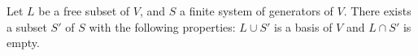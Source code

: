 Let $L$ be a free subset of $V$, and $S$ a finite system of generators of $V$. There exists a subset $S'$ of $S$ with the following properties: $L \cup S'$ is a basis of $V$ and $L \cap S'$ is empty.
